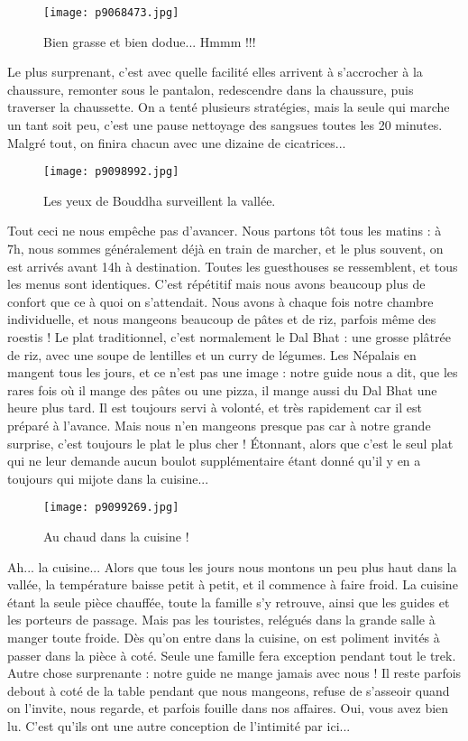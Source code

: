 \documentclass{book}
\begin{document}
\begin{figure}[h]
\centering
\texttt{[image: p9068473.jpg]}
\caption*{Bien grasse et bien dodue... Hmmm !!!}
\end{figure}

Le plus surprenant, c'est avec quelle facilité elles arrivent à s'accrocher à la chaussure, remonter sous le pantalon, redescendre dans la chaussure, puis traverser la chaussette. On a tenté plusieurs stratégies, mais la seule qui marche un tant soit peu, c'est une pause nettoyage des sangsues toutes les 20 minutes. Malgré tout, on finira chacun avec une dizaine de cicatrices...


\begin{figure}[h]
\centering
\texttt{[image: p9098992.jpg]}
\caption*{Les yeux de Bouddha surveillent la vallée.}
\end{figure}

Tout ceci ne nous empêche pas d'avancer. Nous partons tôt tous les matins : à 7h, nous sommes généralement déjà en train de marcher, et le plus souvent, on est arrivés avant 14h à destination. Toutes les guesthouses se ressemblent, et tous les menus sont identiques. C'est répétitif mais nous avons beaucoup plus de confort que ce à quoi on s'attendait. Nous avons à chaque fois notre chambre individuelle, et nous mangeons beaucoup de pâtes et de riz, parfois même des roestis ! Le plat traditionnel, c'est normalement le Dal Bhat : une grosse plâtrée de riz, avec une soupe de lentilles et un curry de légumes. Les Népalais en mangent tous les jours, et ce n'est pas une image : notre guide nous a dit, que les rares fois où il mange des pâtes ou une pizza, il mange aussi du Dal Bhat une heure plus tard. Il est toujours servi à volonté, et très rapidement car il est préparé à l'avance. Mais nous n'en mangeons presque pas car à notre grande surprise, c'est toujours le plat le plus cher ! Étonnant, alors que c'est le seul plat qui ne leur demande aucun boulot supplémentaire étant donné qu'il y en a toujours qui mijote dans la cuisine...


\begin{figure}[h]
\centering
\texttt{[image: p9099269.jpg]}
\caption*{Au chaud dans la cuisine !}
\end{figure}

Ah... la cuisine... Alors que tous les jours nous montons un peu plus haut dans la vallée, la température baisse petit à petit, et il commence à faire froid. La cuisine étant la seule pièce chauffée, toute la famille s'y retrouve, ainsi que les guides et les porteurs de passage. Mais pas les touristes, relégués dans la grande salle à manger toute froide. Dès qu'on entre dans la cuisine, on est poliment invités à passer dans la pièce à coté. Seule une famille fera exception pendant tout le trek. Autre chose surprenante : notre guide ne mange jamais avec nous ! Il reste parfois debout à coté de la table pendant que nous mangeons, refuse de s'asseoir quand on l'invite, nous regarde, et parfois fouille dans nos affaires. Oui, vous avez bien lu. C'est qu'ils ont une autre conception de l'intimité par ici...
\end{document}
